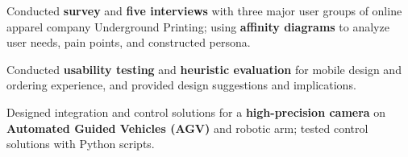 \vspace{-1.0mm}
\resumeItemListStart
\item Conducted \textbf{survey} and \textbf{five interviews} with three major user groups of online apparel company Underground Printing; using \textbf{affinity diagrams} to analyze user needs, pain points, and constructed persona. 
\item Conducted \textbf{usability testing} and \textbf{heuristic evaluation} for mobile design and ordering experience, and provided design suggestions and implications.
\resumeItemListEnd
\vspace{-2.0mm}

        \vspace{-1.0mm}
      \resumeItemListStart
        \item{Designed integration and control solutions for a \textbf{high-precision camera} on \textbf{Automated Guided Vehicles (AGV)} and robotic arm; tested control solutions with Python scripts.}
      \resumeItemListEnd

  \resumeSubHeadingListEnd

